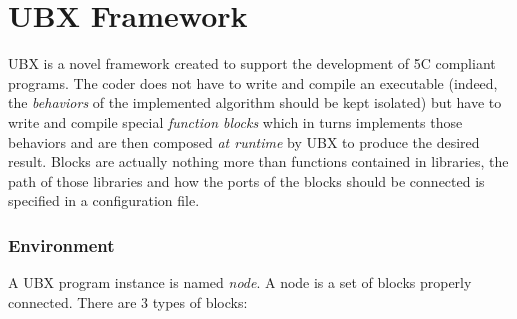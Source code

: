 \chapter{UBX Framework}
\label{ch:introduction} 
UBX is a novel framework created to support the development of 5C compliant programs. The coder does not have to write and compile an executable (indeed, the \emph{behaviors} of the implemented algorithm should be kept isolated) but have to write and compile special \emph{function blocks} which in turns implements those behaviors and are then composed \emph{at runtime} by UBX to produce the desired result. Blocks are actually nothing more than functions contained in libraries, the path of those libraries and how the ports of the blocks should be connected is specified in a configuration file. 

\subsection{Environment}
A UBX program instance is named \emph{node}. A node is a set of blocks properly connected. There are 3 types of blocks:

